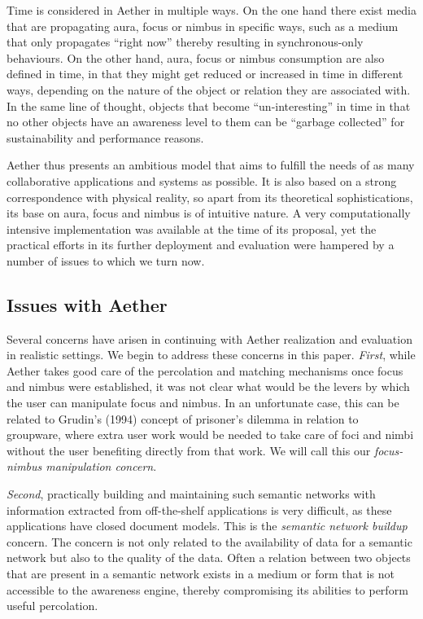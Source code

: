\documentclass{ecscw2007}
\begin{document}
Time is considered in Aether in multiple ways. On the one hand there exist media that are propagating aura, focus or nimbus in specific ways, such as a medium that only propagates ``right now'' thereby resulting in synchronous-only behaviours. On the other hand, aura, focus or nimbus consumption are also defined in time, in that they might get reduced or increased in time in different ways, depending on the nature of the object or relation they are associated with. In the same line of thought, objects that become ``un-interesting'' in time in that no other objects have an awareness level to them can be ``garbage collected'' for sustainability and performance reasons.

Aether thus presents an ambitious model that aims to fulfill the needs of as many collaborative applications and systems as possible. It is also based on a strong correspondence with physical reality, so apart from its theoretical sophistications, its base on aura, focus and nimbus is of intuitive nature. A very computationally intensive implementation was available at the time of its proposal, yet the practical efforts in its further deployment and evaluation were hampered by a number of issues to which we turn now. 

\subsection*{Issues with Aether}
Several concerns have arisen in continuing with Aether realization and evaluation in realistic settings. We begin to address these concerns in this paper.
\textit{First}, while Aether takes good care of the percolation and matching mechanisms once focus and nimbus were established, it was not clear what would be the levers by which the user can manipulate focus and nimbus. In an unfortunate case, this can be related to Grudin's (1994) concept of prisoner's dilemma in relation to groupware, where extra user work would be needed to take care of foci and nimbi without the user benefiting directly from that work. We will call this our \textit{focus-nimbus manipulation concern}.

\textit{Second}, practically building and maintaining such semantic networks with information extracted from off-the-shelf applications is very difficult, as these applications have closed document models. This is the \textit{semantic network buildup} concern. The concern is not only related to the availability of data for a semantic network but also to the quality of the data. Often a relation between two objects that are present in a semantic network exists in a medium or form that is not accessible to the awareness engine, thereby compromising its abilities to perform useful percolation.
\end{document}
